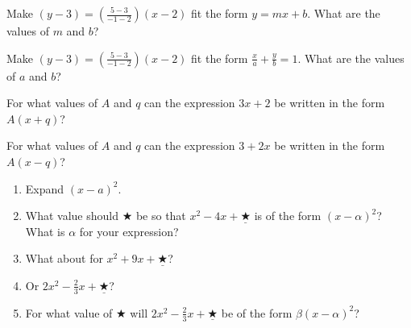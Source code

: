 \bq \be
\item Make $(y-3)=\left( \frac{5-3}{-1-2} \right) (x-2)$ fit the form $y=mx+b$. What are the values of $m$ and $b$?
\item Make $(y-3)=\left( \frac{5-3}{-1-2} \right) (x-2)$ fit the form $\frac{x}{a} +\frac{y}{b} =1$. What are the values of $a$ and $b$?
\ee \eq

\bq \be
\item For what values of $A$ and $q$ can the expression $3x+2$ be written in the form $A(x+q)$?
\item For what values of $A$ and $q$ can the expression $3+2x$ be written in the form $A(x-q)$?
\ee \eq

\bq \begin{enumerate}
\item Expand $(x-a)^2$.
\item What value should $\bigstar$ be so that $x^2-4x +\underline{\bigstar}$ is of the form $(x-\alpha)^2$? What is $\alpha$ for your expression?
\item What about for $x^2+9x+\underline{\bigstar}$?
\item Or $2x^2-\frac{2}{3}x+\underline{\bigstar}$?
\item For what value of $\bigstar$ will $2x^2-\frac{2}{3}x+\underline{\bigstar}$ be of the form $\beta(x-\alpha)^2$?
\end{enumerate}
\eq






